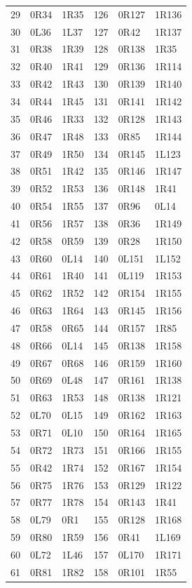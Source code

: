 \begin{longtable}{rll@{\hspace{10mm}}rll}
29 & 0R34 & 1R35 & 126 & 0R127 & 1R136\\
30 & 0L36 & 1L37 & 127 & 0R42 & 1R137\\
31 & 0R38 & 1R39 & 128 & 0R138 & 1R35\\
32 & 0R40 & 1R41 & 129 & 0R136 & 1R114\\
33 & 0R42 & 1R43 & 130 & 0R139 & 1R140\\
34 & 0R44 & 1R45 & 131 & 0R141 & 1R142\\
35 & 0R46 & 1R33 & 132 & 0R128 & 1R143\\
36 & 0R47 & 1R48 & 133 & 0R85 & 1R144\\
37 & 0R49 & 1R50 & 134 & 0R145 & 1L123\\
38 & 0R51 & 1R42 & 135 & 0R146 & 1R147\\
39 & 0R52 & 1R53 & 136 & 0R148 & 1R41\\
40 & 0R54 & 1R55 & 137 & 0R96 & 0L14\\
41 & 0R56 & 1R57 & 138 & 0R36 & 1R149\\
42 & 0R58 & 0R59 & 139 & 0R28 & 1R150\\
43 & 0R60 & 0L14 & 140 & 0L151 & 1L152\\
44 & 0R61 & 1R40 & 141 & 0L119 & 1R153\\
45 & 0R62 & 1R52 & 142 & 0R154 & 1R155\\
46 & 0R63 & 1R64 & 143 & 0R145 & 1R156\\
47 & 0R58 & 0R65 & 144 & 0R157 & 1R85\\
48 & 0R66 & 0L14 & 145 & 0R138 & 1R158\\
49 & 0R67 & 0R68 & 146 & 0R159 & 1R160\\
50 & 0R69 & 0L48 & 147 & 0R161 & 1R138\\
51 & 0R63 & 1R53 & 148 & 0R138 & 1R121\\
52 & 0L70 & 0L15 & 149 & 0R162 & 1R163\\
53 & 0R71 & 0L10 & 150 & 0R164 & 1R165\\
54 & 0R72 & 1R73 & 151 & 0R166 & 1R155\\
55 & 0R42 & 1R74 & 152 & 0R167 & 1R154\\
56 & 0R75 & 1R76 & 153 & 0R129 & 1R122\\
57 & 0R77 & 1R78 & 154 & 0R143 & 1R41\\
58 & 0L79 & 0R1 & 155 & 0R128 & 1R168\\
59 & 0R80 & 1R59 & 156 & 0R41 & 1L169\\
60 & 0L72 & 1L46 & 157 & 0L170 & 1R171\\
61 & 0R81 & 1R82 & 158 & 0R101 & 1R55\\

\end{longtable}
